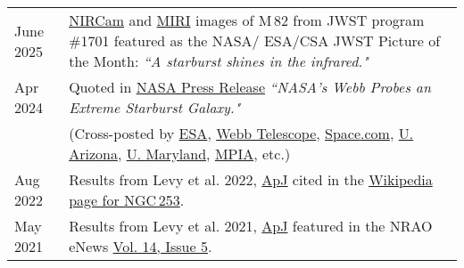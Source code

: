 \documentclass[11pt]{article}
\begin{document}
\begin{longtable}{p{} p{}}


June 2025 & \href{https://esawebb.org/images/potm2506a/}{NIRCam} and \href{https://esawebb.org/images/potm2506b/}{MIRI} images of M\,82 from JWST program \#1701 featured as the NASA/ ESA/CSA JWST Picture of the Month: \textit{``A starburst shines in the infrared."}\smallskip\\  

Apr 2024 & Quoted in \href{https://science.nasa.gov/missions/webb/nasas-webb-probes-an-extreme-starburst-galaxy/}{NASA Press Release} \textit{``NASA's Webb Probes an Extreme Starburst Galaxy."}\\
& {\small (Cross-posted by \href{https://esawebb.org/news/weic2410/}{ESA}, \href{https://webbtelescope.org/contents/news-releases/2024/news-2024-109}{Webb Telescope}, \href{https://www.space.com/james-webb-space-telescope-starburst-galaxy-image}{Space.com}, \href{https://astro.arizona.edu/news/steward-observatorys-rebecca-levy-second-author-jwst-study-probes-extreme-starburst-galaxy}{U. Arizona}, \href{https://cmns.umd.edu/news-events/news/nasas-james-webb-space-telescope-captures-images-galaxy-m82s-glowing-core-and}{U. Maryland}, \href{https://www.mpia.de/news/science/2024-06-jwst-m82}{MPIA}, etc.)}\smallskip\\

Aug 2022 & Results from Levy et al. 2022, \href{https://ui.adsabs.harvard.edu/abs/2022ApJ...935...19L/abstract}{ApJ} cited in the \href{https://en.wikipedia.org/wiki/Sculptor_Galaxy#cite_ref-15}{Wikipedia page for NGC\,253}.\smallskip\\

May 2021 & Results from Levy et al. 2021, \href{https://ui.adsabs.harvard.edu/abs/2021ApJ...912....4L/abstract}{ApJ} featured in the NRAO eNews \href{https://science.nrao.edu/enews/14.5/index.shtml#outflows}{Vol. 14, Issue 5}.\\



\end{longtable}
\end{document}

